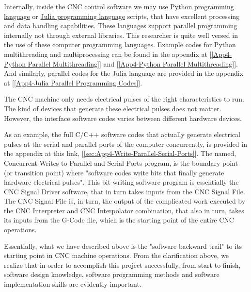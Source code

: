 Internally, inside the CNC control software we may use \href{https://www.python.org/}{Python programming language} or \href{https://julialang.org/}{Julia programming language} scripts, that have excellent processing and data handling capabilities. These languages support parallel programming internally not through external libraries. This researcher is quite well versed in the use of these computer programming languages. Example codes for Python multithreading and multiprocessing can be found in the appendix at [\ref{App4-Python Parallel Multithreading}] and [\ref{App4-Python Parallel Multithreading}]. And similarly, parallel codes for the Julia language are provided in the appendix at [\ref{App4-Julia Parallel Programming Codes}].
\vspace*{1\baselineskip}

The CNC machine only needs electrical pulses of the right characteristics to run. The kind of devices that generate these electrical pulses does not matter. However, the interface software codes varies between different hardware devices.  
\vspace*{1\baselineskip}

As an example, the full C/C++ software codes that actually generate electrical pulses at the serial and parallel ports of the computer concurrently, is provided in the appendix at this link, [\ref{sec:App4-Write-Parallel-Serial-Ports}]. The named, Concurrent-Writes-to-Parallel-and-Serial-Ports program, is the boundary point (or transition point) where "software codes write bits that finally generate hardware electrical pulses". This bit-writing software program is essentially the CNC Signal Driver software, that in turn takes inputs from the CNC Signal File. The CNC Signal File is, in turn, the output of the complicated work executed by the CNC Interpreter and CNC Interpolator combination, that also in turn, takes its inputs from the G-Code file, which is the starting point of the entire CNC operations. 
\vspace*{1\baselineskip}

Essentially, what we have described above is the "software backward trail" to its starting point in CNC machine operations. From the clarification above, we realize that in order to accomplish this project successfully, from start to finish, software design knowledge, software programming methods and software implementation skills are evidently important.

